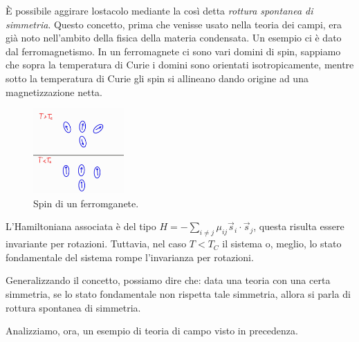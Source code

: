 \`E possibile aggirare lostacolo mediante la così detta \textit{rottura spontanea di simmetria}. Questo concetto, prima che venisse usato nella teoria dei campi, era già noto nell'ambito della fisica della materia condensata. Un esempio ci è dato dal ferromagnetismo. In un ferromagnete ci sono vari domini di spin, sappiamo che sopra la temperatura di Curie i domini sono orientati isotropicamente, mentre sotto la temperatura di Curie gli spin si allineano dando origine ad una magnetizzazione netta.
\begin{figure}[H]
    \centering
    \includegraphics[width=0.31\textwidth]{Immagini/Spin.jpg}
    \caption{Spin di un ferromganete.}
    \label{fig:ferromagnete}
\end{figure}
L'Hamiltoniana associata è del tipo $H=-\sum_{i\neq j}\mu_{ij}\Vec{s}_i\cdot\Vec{s}_j$, questa risulta essere invariante per rotazioni. Tuttavia, nel caso $T<T_C$ il sistema o, meglio, lo stato fondamentale del sistema rompe l'invarianza per rotazioni.

Generalizzando il concetto, possiamo dire che: data una teoria con una certa simmetria, se lo stato fondamentale non rispetta tale simmetria, allora si parla di rottura spontanea di simmetria.

Analizziamo, ora, un esempio di teoria di campo visto in precedenza.

